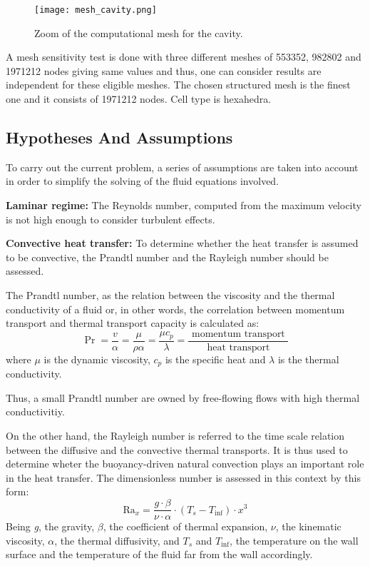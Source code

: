 \begin{figure}[h!]
	\centering
	\texttt{[image: mesh\_cavity.png]}	
	\caption{Zoom of the computational mesh for the cavity.}
	\label{3.2fig}
\end{figure} 
A mesh sensitivity test is done with three different meshes of 553352, 982802 and 1971212 nodes giving same values and thus, one can consider results are independent for these eligible meshes. The chosen structured mesh is the finest one and it consists of 1971212 nodes. Cell type is hexahedra. 

\subsection{Hypotheses And Assumptions}

\setlength{\parindent}{0.5cm} To carry out the current problem, a series of assumptions are taken into account in order to simplify the solving of the fluid equations involved.

\textbf{Laminar regime:} The Reynolds number, computed from the maximum velocity is not high enough to consider turbulent effects. 

\textbf{Convective heat transfer:} To determine whether the heat transfer is assumed to be convective, the Prandtl number and the Rayleigh number should be assessed.

\noindent The Prandtl number, as the relation between the viscosity and the thermal conductivity of a fluid or, in other words, the correlation between momentum transport and thermal transport capacity is calculated as:
\begin{equation}
	\operatorname{Pr}=\frac{v}{\alpha}=\frac{\mu}{\rho \alpha}=\frac{\mu c_{p}}{\lambda}=\frac{\text { momentum transport }}{\text { heat transport }}
	\label{3.3}
\end{equation}
where $\mu$ is the dynamic viscosity, $c_{p}$ is the specific heat and $\lambda$ is the thermal conductivity.

\noindent Thus, a small Prandtl number are owned by free-flowing flows with high thermal conductivitiy.

\noindent On the other hand, the Rayleigh number is referred to the time scale relation between the diffusive and the convective thermal transports. It is thus used to determine wheter the buoyancy-driven natural convection plays an important role in the heat transfer. The dimensionless number is assessed in this context by this form:
\begin{equation}
	\mathrm{Ra}_{x}=\frac{g \cdot \beta}{\nu \cdot \alpha} \cdot\left(T_{s}-T_{\mathrm{inf}}\right) \cdot x^{3}
	\label{3.4}
\end{equation}
Being \textit{g}, the gravity, \textit{$\beta$}, the coefficient of thermal expansion, \textit{$\nu$}, the kinematic viscosity, \textit{$\alpha$}, the thermal diffusivity, and \textit{$T_{s}$} and \textit{$T_{\mathrm{inf}}$}, the temperature on the wall surface and the temperature of the fluid far from the wall accordingly.

